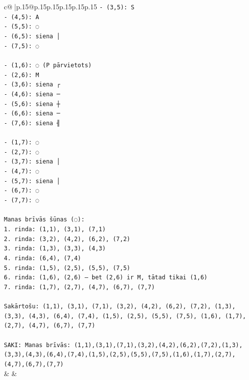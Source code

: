 \documentclass{article}
\begin{document}
{\begin{supertabular}{c@{$\;$}|p{.15\linewidth}@{}p{.15\linewidth}p{.15\linewidth}p{.15\linewidth}p{.15\linewidth}p{.15\linewidth}}
{{{\texttt{{-} (3,5): S} \\
\texttt{{-} (4,5): A} \\
\texttt{{-} (5,5): ◌} \\
\texttt{{-} (6,5): siena │} \\
\texttt{{-} (7,5): ◌} \\
\\ 
\texttt{{-} (1,6): ◌ (P pārvietots)} \\
\texttt{{-} (2,6): M} \\
\texttt{{-} (3,6): siena ┌} \\
\texttt{{-} (4,6): siena ─} \\
\texttt{{-} (5,6): siena ┼} \\
\texttt{{-} (6,6): siena ─} \\
\texttt{{-} (7,6): siena ╢} \\
\\ 
\texttt{{-} (1,7): ◌} \\
\texttt{{-} (2,7): ◌} \\
\texttt{{-} (3,7): siena │} \\
\texttt{{-} (4,7): ◌} \\
\texttt{{-} (5,7): siena │} \\
\texttt{{-} (6,7): ◌} \\
\texttt{{-} (7,7): ◌} \\
\\ 
\texttt{Manas brīvās šūnas (◌):} \\
\texttt{1. rinda: (1,1), (3,1), (7,1)} \\
\texttt{2. rinda: (3,2), (4,2), (6,2), (7,2)} \\
\texttt{3. rinda: (1,3), (3,3), (4,3)} \\
\texttt{4. rinda: (6,4), (7,4)} \\
\texttt{5. rinda: (1,5), (2,5), (5,5), (7,5)} \\
\texttt{6. rinda: (1,6), (2,6) — bet (2,6) ir M, tātad tikai (1,6)} \\
\texttt{7. rinda: (1,7), (2,7), (4,7), (6,7), (7,7)} \\
\\ 
\texttt{Sakārtošu: (1,1), (3,1), (7,1), (3,2), (4,2), (6,2), (7,2), (1,3), (3,3), (4,3), (6,4), (7,4), (1,5), (2,5), (5,5), (7,5), (1,6), (1,7), (2,7), (4,7), (6,7), (7,7)} \\
\\ 
\texttt{SAKI: Manas brīvās: (1,1),(3,1),(7,1),(3,2),(4,2),(6,2),(7,2),(1,3),(3,3),(4,3),(6,4),(7,4),(1,5),(2,5),(5,5),(7,5),(1,6),(1,7),(2,7),(4,7),(6,7),(7,7)} \\
            }
        }
    }
    & & \\ \\


\end{supertabular}}
\end{document}
